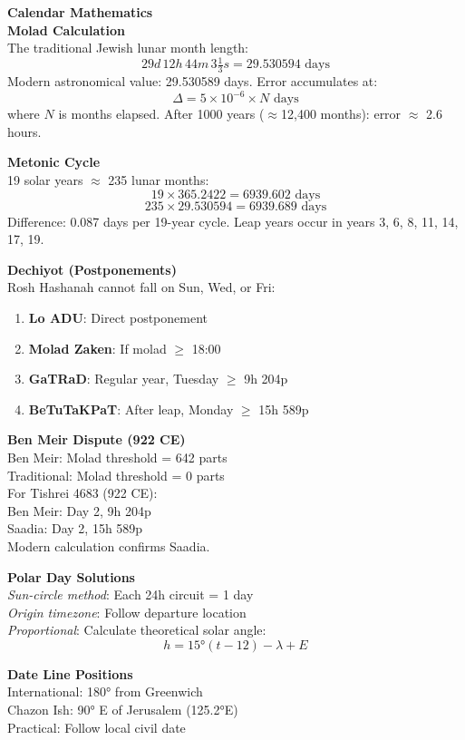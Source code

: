 \begin{technical}
{\Large\textbf{Calendar Mathematics}}\\[0.5em]

\textbf{Molad Calculation}\\[0.3em]
The traditional Jewish lunar month length:
\[
29d\,12h\,44m\,3\tfrac{1}{3}s = 29.530594\text{ days}
\]
Modern astronomical value: 29.530589 days. Error accumulates at:
\[
\Delta = 5 \times 10^{-6} \times N \text{ days}
\]
where $N$ is months elapsed. After 1000 years ($\approx$12,400 months): error $\approx$ 2.6 hours.

\textbf{Metonic Cycle}\\[0.3em]
19 solar years $\approx$ 235 lunar months:
\[
19 \times 365.2422 = 6939.602\text{ days}
\]
\[
235 \times 29.530594 = 6939.689\text{ days}
\]
Difference: 0.087 days per 19-year cycle. Leap years occur in years 3, 6, 8, 11, 14, 17, 19.

\textbf{Dechiyot (Postponements)}\\[0.3em]
Rosh Hashanah cannot fall on Sun, Wed, or Fri:
\begin{enumerate}[leftmargin=*,topsep=0pt,itemsep=0pt]
\item \textbf{Lo ADU}: Direct postponement
\item \textbf{Molad Zaken}: If molad $\geq$ 18:00
\item \textbf{GaTRaD}: Regular year, Tuesday $\geq$ 9h 204p
\item \textbf{BeTuTaKPaT}: After leap, Monday $\geq$ 15h 589p
\end{enumerate}

\textbf{Ben Meir Dispute (922 CE)}\\[0.3em]
Ben Meir: Molad threshold = 642 parts\\
Traditional: Molad threshold = 0 parts\\
For Tishrei 4683 (922 CE):\\
Ben Meir: Day 2, 9h 204p\\
Saadia: Day 2, 15h 589p\\
Modern calculation confirms Saadia.

\textbf{Polar Day Solutions}\\[0.3em]
\textit{Sun-circle method}: Each 24h circuit = 1 day\\
\textit{Origin timezone}: Follow departure location\\
\textit{Proportional}: Calculate theoretical solar angle:
\[
h = 15°(t-12) - \lambda + E
\]

\textbf{Date Line Positions}\\[0.3em]
International: 180° from Greenwich\\
Chazon Ish: 90° E of Jerusalem (125.2°E)\\
Practical: Follow local civil date\\


\end{technical}
